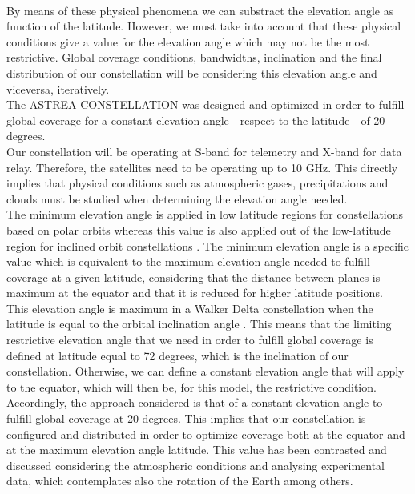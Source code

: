\paragraph{}

By means of these physical phenomena we can substract the elevation angle as function of the latitude. However, we must take into account that these physical conditions give a value for the elevation angle which may not be the most restrictive. Global coverage conditions, bandwidths, inclination and the final distribution of our constellation will be considering this elevation angle and viceversa, iteratively. \\

The ASTREA CONSTELLATION was designed and optimized in order to fulfill global coverage for a constant elevation angle - respect to the latitude - of 20 degrees.\\

Our constellation will be operating at S-band for telemetry and X-band for data relay. Therefore, the satellites need to be operating up to 10 GHz. This directly implies that physical conditions such as atmospheric gases, precipitations and clouds must be studied when determining the elevation angle needed. \\

The minimum elevation angle is applied in low latitude regions for constellations based on polar orbits whereas this value is also applied out of the low-latitude region for inclined orbit constellations \cite{Li2016}. The minimum elevation angle is a specific value which is equivalent to the maximum elevation angle needed to fulfill coverage at a given latitude, considering that the distance between planes is maximum at the equator and that it is reduced for higher latitude positions.\\

This elevation angle is maximum in a Walker Delta constellation when the latitude is equal to the orbital inclination angle \cite{Li2016}. This means that the limiting restrictive elevation angle that we need in order to fulfill global coverage is defined at latitude equal to 72 degrees, which is the inclination of our constellation. Otherwise, we can define a constant elevation angle that will apply to the equator, which will then be, for this model, the restrictive condition. \\

Accordingly, the approach considered is that of a constant elevation angle to fulfill global coverage at 20 degrees. This implies that our constellation is configured and distributed in order to optimize coverage both at the equator and at the maximum elevation angle latitude. This value has been contrasted and discussed considering the atmospheric conditions and analysing experimental data, which contemplates also the rotation of the Earth among others. \\

